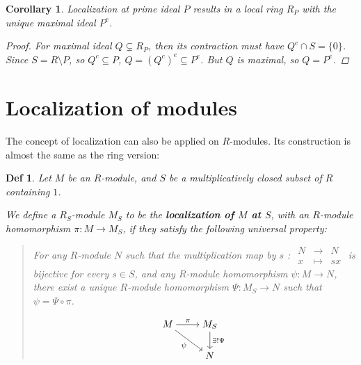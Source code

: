 \documentclass[a4paper]{article}
\theoremstyle{mystyle}
\newtheorem{definition}{Def}
\newtheorem{coro}{Corollary}
\begin{document}
\begin{coro}
  Localization at prime ideal $P$ results in a local ring $R_P$ with the unique 
  maximal ideal $P^e$.

  \begin{proof}
    For maximal ideal $Q \subsetneq R_P$, then its contraction
    must have $Q^c \cap S = \{0\}$. Since $S = R \setminus P$, so $Q^c \subseteq P$,
    $Q = (Q^c)^e \subseteq P^e$. But $Q$ is maximal, so $Q = P^e$.
  \end{proof}
\end{coro}

\section{Localization of modules}

The concept of localization can also be applied on $R$-modules.
Its construction is almost the same as the ring version:

\begin{definition}
  Let $M$ be an $R$-module, and $S$ be a multiplicatively closed subset of $R$ 
  containing $1$.

  We define a $R_S$-module $M_S$ to be the {\bf localization of $M$ at $S$}, 
  with an $R$-module homomorphism $\pi : M \to M_S$, if they  
  satisfy the following universal property:
  \begin{quote}
    For any $R$-module $N$ such that the multiplication map by $s$ : 
    $
    \begin{array}{ccc}
    N &\to& N \\
    x &\mapsto& sx
    \end{array}
    $
    is bijective for every $s \in S$,
    and any $R$-module homomorphism $\psi : M \to N$, 
    there exist a unique $R$-module homomorphism $\Psi : M_S \to N$
    such that $\psi = \Psi \circ \pi$.

    \[
      \begin{tikzcd}[cramped]
        M \arrow{r}{\pi} \arrow[swap]{dr}{\psi} & M_S \arrow{d}{\exists! \Psi} \\
         & N
      \end{tikzcd}
    \]

  \end{quote}
\end{definition}
\end{document}

